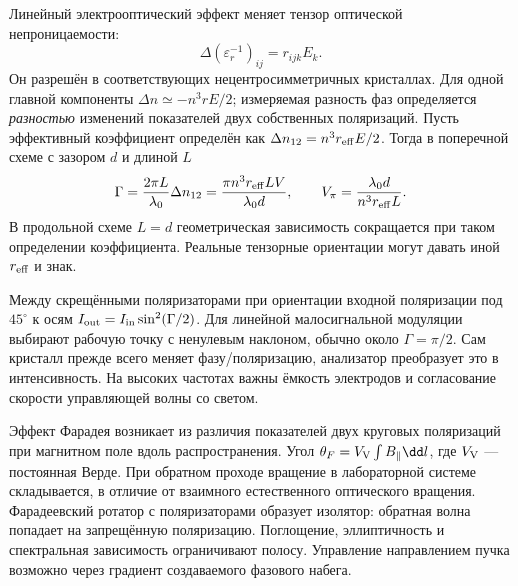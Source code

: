 
Линейный электрооптический эффект меняет тензор оптической непроницаемости:
\begin{equation}
 \Delta(\varepsilon_r^{-1})_{ij}=r_{ijk}E_k.
\end{equation}
Он разрешён в соответствующих нецентросимметричных кристаллах. Для одной главной компоненты $\Delta n\simeq-n^3rE/2$; измеряемая разность фаз определяется \emph{разностью} изменений показателей двух собственных поляризаций. Пусть эффективный коэффициент определён как $\Delta n_{12}=n^3r_{\rm eff}E/2$. Тогда в поперечной схеме с зазором $d$ и длиной $L$
\begin{equation}
 \Gamma=\frac{2\pi L}{\lambda_0}\Delta n_{12}
 =\frac{\pi n^3r_{\rm eff}LV}{\lambda_0d},\qquad
 V_\pi=\frac{\lambda_0d}{n^3r_{\rm eff}L}.
\end{equation}
В продольной схеме $L=d$ геометрическая зависимость сокращается при таком определении коэффициента. Реальные тензорные ориентации могут давать иной $r_{\rm eff}$ и знак.

Между скрещёнными поляризаторами при ориентации входной поляризации под $45^\circ$ к осям $I_{\rm out}=I_{\rm in}\sin^2(\Gamma/2)$. Для линейной малосигнальной модуляции выбирают рабочую точку с ненулевым наклоном, обычно около $\Gamma=\pi/2$. Сам кристалл прежде всего меняет фазу/поляризацию, анализатор преобразует это в интенсивность. На высоких частотах важны ёмкость электродов и согласование скорости управляющей волны со светом.

Эффект Фарадея возникает из различия показателей двух круговых поляризаций при магнитном поле вдоль распространения. Угол $\theta_F=V_{\rm V}\int B_\parallel\dd l$, где $V_{\rm V}$ — постоянная Верде. При обратном проходе вращение в лабораторной системе складывается, в отличие от взаимного естественного оптического вращения. Фарадеевский ротатор с поляризаторами образует изолятор: обратная волна попадает на запрещённую поляризацию. Поглощение, эллиптичность и спектральная зависимость ограничивают полосу. Управление направлением пучка возможно через градиент создаваемого фазового набега.
